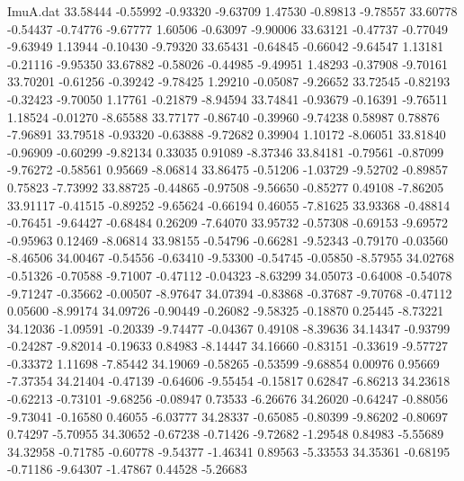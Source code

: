 \begin{filecontents}{ImuA.dat}
  33.58444   -0.55992   -0.93320   -9.63709    1.47530   -0.89813   -9.78557
  33.60778   -0.54437   -0.74776   -9.67777    1.60506   -0.63097   -9.90006
  33.63121   -0.47737   -0.77049   -9.63949    1.13944   -0.10430   -9.79320
  33.65431   -0.64845   -0.66042   -9.64547    1.13181   -0.21116   -9.95350
  33.67882   -0.58026   -0.44985   -9.49951    1.48293   -0.37908   -9.70161
  33.70201   -0.61256   -0.39242   -9.78425    1.29210   -0.05087   -9.26652
  33.72545   -0.82193   -0.32423   -9.70050    1.17761   -0.21879   -8.94594
  33.74841   -0.93679   -0.16391   -9.76511    1.18524   -0.01270   -8.65588
  33.77177   -0.86740   -0.39960   -9.74238    0.58987    0.78876   -7.96891
  33.79518   -0.93320   -0.63888   -9.72682    0.39904    1.10172   -8.06051
  33.81840   -0.96909   -0.60299   -9.82134    0.33035    0.91089   -8.37346
  33.84181   -0.79561   -0.87099   -9.76272   -0.58561    0.95669   -8.06814
  33.86475   -0.51206   -1.03729   -9.52702   -0.89857    0.75823   -7.73992
  33.88725   -0.44865   -0.97508   -9.56650   -0.85277    0.49108   -7.86205
  33.91117   -0.41515   -0.89252   -9.65624   -0.66194    0.46055   -7.81625
  33.93368   -0.48814   -0.76451   -9.64427   -0.68484    0.26209   -7.64070
  33.95732   -0.57308   -0.69153   -9.69572   -0.95963    0.12469   -8.06814
  33.98155   -0.54796   -0.66281   -9.52343   -0.79170   -0.03560   -8.46506
  34.00467   -0.54556   -0.63410   -9.53300   -0.54745   -0.05850   -8.57955
  34.02768   -0.51326   -0.70588   -9.71007   -0.47112   -0.04323   -8.63299
  34.05073   -0.64008   -0.54078   -9.71247   -0.35662   -0.00507   -8.97647
  34.07394   -0.83868   -0.37687   -9.70768   -0.47112    0.05600   -8.99174
  34.09726   -0.90449   -0.26082   -9.58325   -0.18870    0.25445   -8.73221
  34.12036   -1.09591   -0.20339   -9.74477   -0.04367    0.49108   -8.39636
  34.14347   -0.93799   -0.24287   -9.82014   -0.19633    0.84983   -8.14447
  34.16660   -0.83151   -0.33619   -9.57727   -0.33372    1.11698   -7.85442
  34.19069   -0.58265   -0.53599   -9.68854    0.00976    0.95669   -7.37354
  34.21404   -0.47139   -0.64606   -9.55454   -0.15817    0.62847   -6.86213
  34.23618   -0.62213   -0.73101   -9.68256   -0.08947    0.73533   -6.26676
  34.26020   -0.64247   -0.88056   -9.73041   -0.16580    0.46055   -6.03777
  34.28337   -0.65085   -0.80399   -9.86202   -0.80697    0.74297   -5.70955
  34.30652   -0.67238   -0.71426   -9.72682   -1.29548    0.84983   -5.55689
  34.32958   -0.71785   -0.60778   -9.54377   -1.46341    0.89563   -5.33553
  34.35361   -0.68195   -0.71186   -9.64307   -1.47867    0.44528   -5.26683

\end{filecontents}

